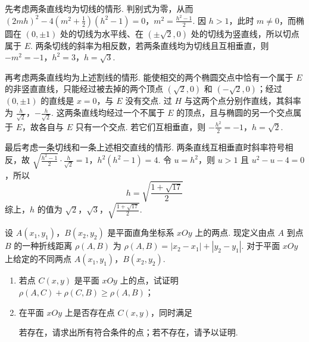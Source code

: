 \begin{solution}
\begin{enumerate}
先考虑两条直线均为切线的情形. 判别式为零，从而
\((2mh)^2-4\left(m^2+\frac12\right)(h^2-1)=0\)，\(m^2=\frac{h^2-1}{2}\).
因 \(h>1\)，此时 \(m\ne0\)，而椭圆在 \((0,\pm1)\) 处的切线为水平线、在 \((\pm\sqrt2,0)\) 处的切线为竖直线，所以切点属于 \(E\).
两条切线的斜率为相反数，若两条直线均为切线且互相垂直，则
\(-m^2=-1\)，\(h^2=3\)，\(h=\sqrt3\).

再考虑两条直线均为上述割线的情形. 能使相交的两个椭圆交点中恰有一个属于 \(E\) 的非竖直直线，只能经过被去掉的两个顶点 \((\sqrt2,0)\) 和 \((-\sqrt2,0)\)；经过 \((0,\pm1)\) 的直线是 \(x=0\)，与 \(E\) 没有交点. 过 \(H\) 与这两个点分别作直线，其斜率为
\(\frac{h}{\sqrt2}\)，\(-\frac{h}{\sqrt2}\).
这两条直线均经过一个不属于 \(E\) 的顶点，且与椭圆的另一个交点属于 \(E\)，故各自与 \(E\) 只有一个交点. 若它们互相垂直，则
\(-\frac{h^2}{2}=-1\)，\(h=\sqrt2\).

最后考虑一条切线和一条上述相交直线的情形. 两条直线互相垂直时斜率符号相反，故
\(\sqrt{\frac{h^2-1}{2}}\cdot\frac{h}{\sqrt2}=1\)，\(h^2(h^2-1)=4\).
令 \(u=h^2\)，则 \(u>1\) 且 \(u^2-u-4=0\)，所以
\[
h=\sqrt{\frac{1+\sqrt{17}}{2}}
\]
综上，\(h\) 的值为
\(\boxed{\sqrt2}\)，\(\boxed{\sqrt3}\)，\(\boxed{\sqrt{\frac{1+\sqrt{17}}{2}}}\).
\end{enumerate}
\end{solution}

\begin{problem}
设 \(A(x_{1},y_{1})\)，\(B(x_{2},y_{2})\) 是平面直角坐标系 \(xOy\) 上的两点. 现定义由点 \(A\) 到点 \(B\) 的一种折线距离 \(\rho(A,B)\) 为 \(\rho(A,B) = |x_2 - x_1| + |y_2 - y_1|\). 对于平面 \(xOy\) 上给定的不同两点 \(A(x_{1},y_{1})\)，\(B(x_{2},y_{2})\).

\begin{enumerate}
\item 若点 \(C(x, y)\) 是平面 \(xOy\) 上的点，试证明 \(\rho(A,C) + \rho(C,B) \geqslant \rho(A,B)\)；
\item 在平面 \(xOy\) 上是否存在点 \(C(x, y)\)，同时满足
若存在，请求出所有符合条件的点；若不存在，请予以证明.
\end{enumerate}
\end{problem}

